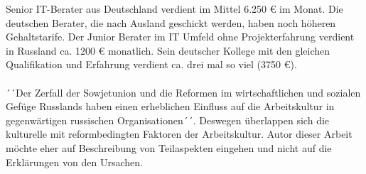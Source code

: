 	
	


	Senior IT-Berater aus Deutschland verdient im Mittel 6.250 € im Monat. Die deutschen Berater, die nach Ausland geschickt werden, haben noch höheren Gehaltstarife. %
	Der Junior Berater im IT Umfeld ohne Projekterfahrung  verdient in Russland ca. 1200 € monatlich.
	Sein deutscher Kollege mit den gleichen Qualifikation und Erfahrung verdient ca. drei mal so viel (3750 €).
	\\
	\\
	´´Der Zerfall der Sowjetunion und die Reformen im wirtschaftlichen und sozialen Gefüge Russlands haben einen erheblichen Einfluss auf die Arbeitskultur in gegenwärtigen russischen Organisationen´´.
	 Deswegen überlappen sich die kulturelle mit reformbedingten Faktoren der Arbeitskultur. Autor dieser Arbeit möchte eher auf Beschreibung von Teilaspekten  eingehen und nicht auf die Erklärungen von den Ursachen.\\
	
